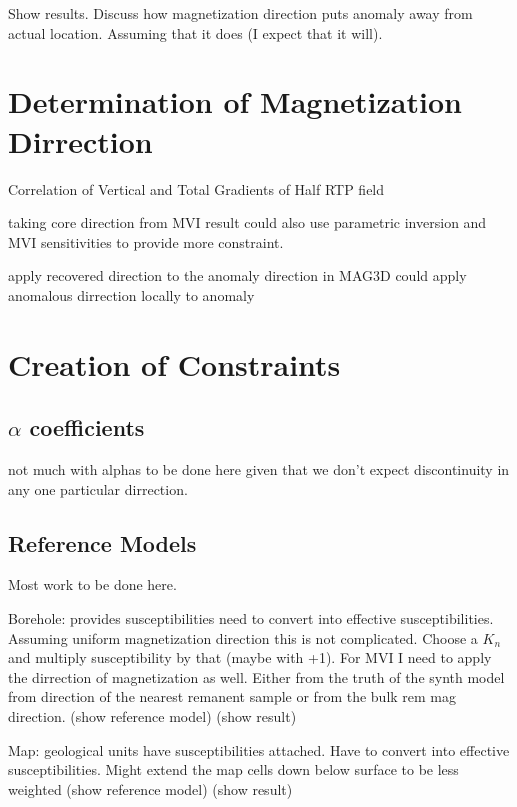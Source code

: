 Show results. Discuss how magnetization direction puts anomaly away from actual location. Assuming that it does (I expect that it will).

\section{Determination of Magnetization Dirrection}
\label{sec:Determination of Magnetization Dirrection}

Correlation of Vertical and Total Gradients of Half RTP field \cite{dannemiller2006MagDirection}

taking core direction from MVI result 
could also use parametric inversion and MVI sensitivities to provide more constraint.

apply recovered direction to the anomaly direction in MAG3D
could apply anomalous dirrection locally to anomaly 

\section{Creation of Constraints}
\label{sec:Creation of Constraints:ElPoma2}

\subsection{$\alpha$ coefficients}
\label{sec:alpha coefficients:ElPoma2}

not much with alphas to be done here given that we don't expect discontinuity in any one particular dirrection.

\subsection{Reference Models}
\label{sec:Reference Models:ElPoma2}

Most work to be done here. 

Borehole: provides susceptibilities need to convert into effective susceptibilities. Assuming uniform magnetization direction this is not complicated. Choose a $K_n$ and multiply susceptibility by that (maybe with +1). For MVI I need to apply the dirrection of magnetization as well. Either from the truth of the synth model from direction of the nearest remanent sample or from the bulk rem mag direction.
(show reference model)
(show result)


Map: geological units have susceptibilities attached. Have to convert into effective susceptibilities. Might extend the map cells down below surface to be less weighted
(show reference model)
(show result)


